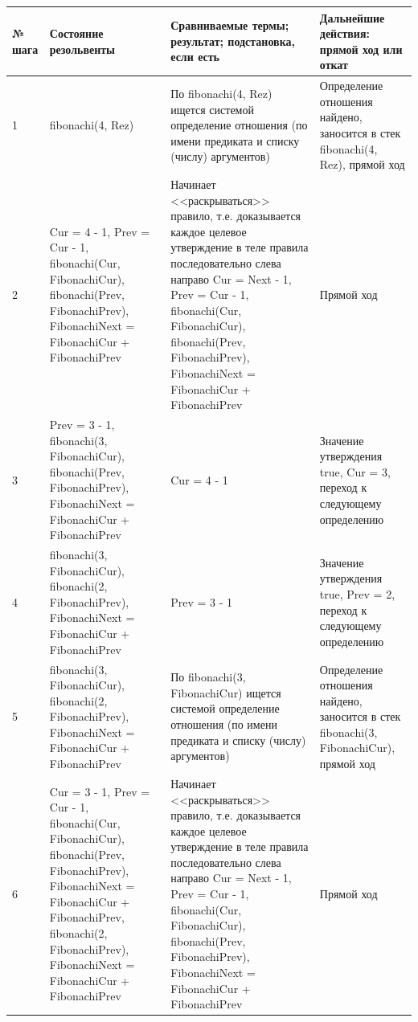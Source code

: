 \documentclass[a4paper,14pt]{extreport} %
\begin{document}
\begin{longtable}{|p{0.5cm}|p{5cm}|p{6cm}|p{5.5cm}|}
	\hline
 	№ шага & Состояние резольвенты & Сравниваемые термы; результат; подстановка, если есть  & Дальнейшие действия: прямой ход или откат \\ \hline
	1 & fibonachi(4, Rez) & По fibonachi(4, Rez) ищется системой определение отношения (по имени предиката и списку (числу) аргументов) & Определение отношения найдено, заносится в стек fibonachi(4, Rez), прямой ход \\ \hline
	2 &Cur = 4 - 1, Prev = Cur - 1, fibonachi(Cur, FibonachiCur), fibonachi(Prev, FibonachiPrev), FibonachiNext = FibonachiCur + FibonachiPrev & Начинает <<раскрываться>> правило, т.е. доказывается каждое целевое утверждение в теле правила последовательно слева направо
	Cur = Next - 1, Prev = Cur - 1, fibonachi(Cur, FibonachiCur), fibonachi(Prev, FibonachiPrev), FibonachiNext = FibonachiCur + FibonachiPrev & Прямой ход\\ \hline
	
	3 & Prev = 3 - 1, fibonachi(3, FibonachiCur), fibonachi(Prev, FibonachiPrev), FibonachiNext = FibonachiCur + FibonachiPrev & Cur = 4 - 1	
	& Значение утверждения true, Cur = 3, переход к следующему определению\\ \hline
	
	4 & fibonachi(3, FibonachiCur), fibonachi(2, FibonachiPrev), FibonachiNext = FibonachiCur + FibonachiPrev & Prev = 3 - 1	
	& Значение утверждения true, Prev = 2, переход к следующему определению\\ \hline
	
	5 & fibonachi(3, FibonachiCur), fibonachi(2, FibonachiPrev), FibonachiNext = FibonachiCur + FibonachiPrev &  По fibonachi(3, FibonachiCur) ищется системой определение отношения (по имени предиката и списку (числу) аргументов) & Определение отношения найдено, заносится в стек fibonachi(3, FibonachiCur), прямой ход \\ \hline
	
	6 & Cur = 3 - 1, Prev = Cur - 1, fibonachi(Cur, FibonachiCur), fibonachi(Prev, FibonachiPrev), FibonachiNext = FibonachiCur + FibonachiPrev, fibonachi(2, FibonachiPrev), FibonachiNext = FibonachiCur + FibonachiPrev &  Начинает <<раскрываться>> правило, т.е. доказывается каждое целевое утверждение в теле правила последовательно слева направо
	Cur = Next - 1, Prev = Cur - 1, fibonachi(Cur, FibonachiCur), fibonachi(Prev, FibonachiPrev), FibonachiNext = FibonachiCur + FibonachiPrev & Прямой ход\\ \hline
	

\end{longtable}
\end{document}
